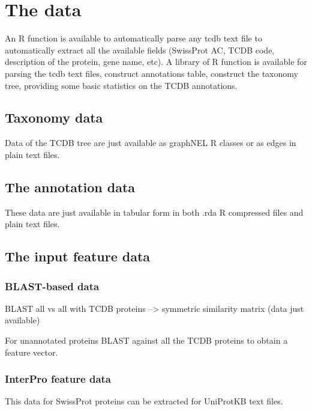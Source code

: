 \documentclass[english]{article}
\begin{document}
\section{The data}
\label{}

An R function is available to automatically parse  any tcdb text file to automatically extract all the available fields
(SwissProt AC, TCDB code, description of the protein, gene name,  etc).
A library of R function is available for parsing the tcdb text files, construct annotations table, construct the taxonomy tree,
providing some basic statistics on the TCDB annotations.


\subsection{Taxonomy data}
\label{}

Data of the TCDB tree are just available as graphNEL R classes or as edges in plain text files.


\subsection{The annotation data}
\label{}

These data are just available in tabular form in both .rda R compressed files and plain text files.

\subsection{The input feature data}
\label{}


\subsubsection{BLAST-based data}
BLAST all vs all with TCDB proteins --> symmetric similarity matrix (data just available)

For unannotated proteins BLAST against all the TCDB proteins to obtain a feature vector.

\subsubsection{InterPro feature data}
This data for SwissProt proteins can be extracted for UniProtKB text files.
\end{document}
